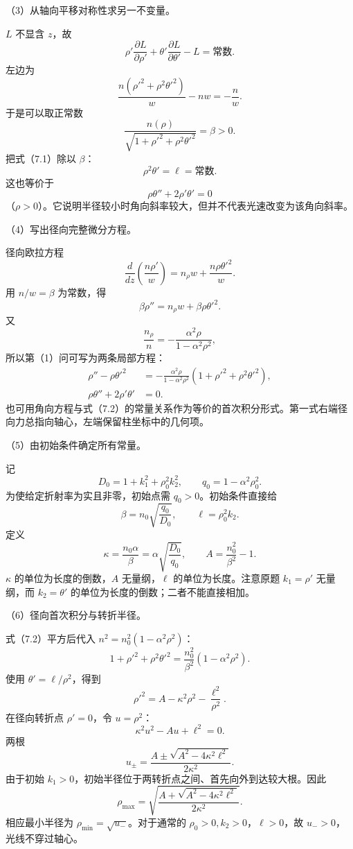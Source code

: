 \documentclass[12pt,a4paper,fontset=fandol]{ctexart}
\begin{document}
（3）从轴向平移对称性求另一不变量。

\(L\) 不显含 \(z\)，故 \[
\rho'\frac{\partial L}{\partial\rho'}
+\theta'\frac{\partial L}{\partial\theta'}-L
=\text{常数}.
\] 左边为 \[
\frac{n(\rho'^2+\rho^2\theta'^2)}w-nw
=-\frac nw.
\] 于是可以取正常数 \[
\boxed{\frac{n(\rho)}{\sqrt{1+\rho'^2+\rho^2\theta'^2}}
=\beta>0.}\tag{7.2}
\] 把式（7.1）除以 \(\beta\)： \[
\boxed{\rho^2\theta'=\ell=\text{常数}.}\tag{7.3}
\] 这也等价于 \[
\rho\theta''+2\rho'\theta'=0
\]
（\(\rho>0\)）。它说明半径较小时角向斜率较大，但并不代表光速改变为该角向斜率。

（4）写出径向完整微分方程。

径向欧拉方程 \[
\frac{d}{dz}\left(\frac{n\rho'}w\right)
=n_\rho w+\frac{n\rho\theta'^2}{w}.
\] 用 \(n/w=\beta\) 为常数，得 \[
\beta\rho''=n_\rho w+\beta\rho\theta'^2.
\] 又 \[
\frac{n_\rho}{n}
=-\frac{\alpha^2\rho}{1-\alpha^2\rho^2},
\] 所以第（1）问可写为两条局部方程： \[
\boxed{
\begin{aligned}
\rho''-\rho\theta'^2
&=-\frac{\alpha^2\rho}{1-\alpha^2\rho^2}
(1+\rho'^2+\rho^2\theta'^2),\\
\rho\theta''+2\rho'\theta'&=0.
\end{aligned}}\tag{7.4}
\]
也可用角向方程与式（7.2）的常量关系作为等价的首次积分形式。第一式右端径向力总指向轴心，左端保留柱坐标中的几何项。

（5）由初始条件确定所有常量。

记 \[
D_0=1+k_1^2+\rho_0^2k_2^2,\qquad
q_0=1-\alpha^2\rho_0^2.
\] 为使给定折射率为实且非零，初始点需 \(q_0>0\)。初始条件直接给 \[
\boxed{\beta=n_0\sqrt{\frac{q_0}{D_0}},
\qquad \ell=\rho_0^2k_2.}\tag{7.5}
\] 定义 \[
\kappa=\frac{n_0\alpha}{\beta}
=\alpha\sqrt{\frac{D_0}{q_0}},
\qquad
A=\frac{n_0^2}{\beta^2}-1.
\] \(\kappa\) 的单位为长度的倒数，\(A\) 无量纲，\(\ell\)
的单位为长度。注意原题 \(k_1=\rho'\) 无量纲，而 \(k_2=\theta'\)
的单位为长度的倒数；二者不能直接相加。

（6）径向首次积分与转折半径。

式（7.2）平方后代入 \(n^2=n_0^2(1-\alpha^2\rho^2)\)： \[
1+\rho'^2+\rho^2\theta'^2
=\frac{n_0^2}{\beta^2}(1-\alpha^2\rho^2).
\] 使用 \(\theta'=\ell/\rho^2\)，得到 \[
\boxed{\rho'^2=A-\kappa^2\rho^2-\frac{\ell^2}{\rho^2}.}\tag{7.6}
\] 在径向转折点 \(\rho'=0\)，令 \(u=\rho^2\)： \[
\kappa^2u^2-Au+\ell^2=0.
\] 两根 \[
u_\pm=\frac{A\pm\sqrt{A^2-4\kappa^2\ell^2}}{2\kappa^2}.
\] 由于初始
\(k_1>0\)，初始半径位于两转折点之间、首先向外到达较大根。因此 \[
\boxed{\rho_{\max}=
\sqrt{\frac{A+\sqrt{A^2-4\kappa^2\ell^2}}
{2\kappa^2}}.}\tag{7.7}
\] 相应最小半径为 \(\rho_{\min}=\sqrt{u_-}\)。对于通常的
\(\rho_0>0,k_2>0\)，\(\ell>0\)，故 \(u_->0\)，光线不穿过轴心。
\end{document}

